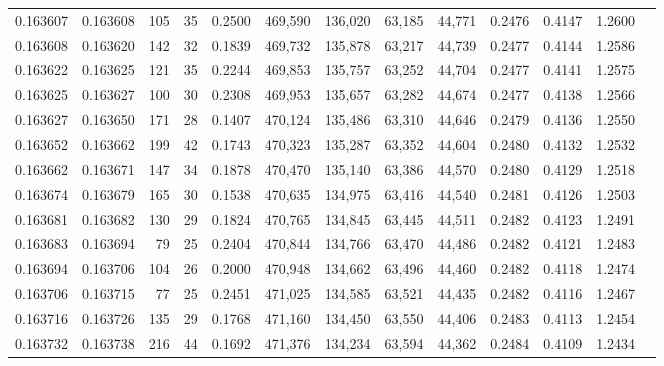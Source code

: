 \begin{tabular}{rrrrrrrrrrrrr}
0.163607 & 0.163608 &   105 &  35 &                                     0.2500 & 469,590 & 136,020 &  63,185 &  44,771 & 0.2476 & 0.4147 & 1.2600 \\
0.163608 & 0.163620 &   142 &  32 &                                     0.1839 & 469,732 & 135,878 &  63,217 &  44,739 & 0.2477 & 0.4144 & 1.2586 \\
0.163622 & 0.163625 &   121 &  35 &                                     0.2244 & 469,853 & 135,757 &  63,252 &  44,704 & 0.2477 & 0.4141 & 1.2575 \\
0.163625 & 0.163627 &   100 &  30 &                                     0.2308 & 469,953 & 135,657 &  63,282 &  44,674 & 0.2477 & 0.4138 & 1.2566 \\
0.163627 & 0.163650 &   171 &  28 &                                     0.1407 & 470,124 & 135,486 &  63,310 &  44,646 & 0.2479 & 0.4136 & 1.2550 \\
0.163652 & 0.163662 &   199 &  42 &                                     0.1743 & 470,323 & 135,287 &  63,352 &  44,604 & 0.2480 & 0.4132 & 1.2532 \\
0.163662 & 0.163671 &   147 &  34 &                                     0.1878 & 470,470 & 135,140 &  63,386 &  44,570 & 0.2480 & 0.4129 & 1.2518 \\
0.163674 & 0.163679 &   165 &  30 &                                     0.1538 & 470,635 & 134,975 &  63,416 &  44,540 & 0.2481 & 0.4126 & 1.2503 \\
0.163681 & 0.163682 &   130 &  29 &                                     0.1824 & 470,765 & 134,845 &  63,445 &  44,511 & 0.2482 & 0.4123 & 1.2491 \\
0.163683 & 0.163694 &    79 &  25 &                                     0.2404 & 470,844 & 134,766 &  63,470 &  44,486 & 0.2482 & 0.4121 & 1.2483 \\
0.163694 & 0.163706 &   104 &  26 &                                     0.2000 & 470,948 & 134,662 &  63,496 &  44,460 & 0.2482 & 0.4118 & 1.2474 \\
0.163706 & 0.163715 &    77 &  25 &                                     0.2451 & 471,025 & 134,585 &  63,521 &  44,435 & 0.2482 & 0.4116 & 1.2467 \\
0.163716 & 0.163726 &   135 &  29 &                                     0.1768 & 471,160 & 134,450 &  63,550 &  44,406 & 0.2483 & 0.4113 & 1.2454 \\
0.163732 & 0.163738 &   216 &  44 &                                     0.1692 & 471,376 & 134,234 &  63,594 &  44,362 & 0.2484 & 0.4109 & 1.2434 \\

\end{tabular}
